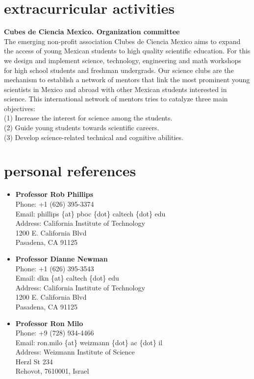 \documentclass[]{friggeri-cv}
\begin{document}
\section{extracurricular activities}
\textbf{Cubes de Ciencia Mexico. Organization committee}\\
The emerging non-profit association Clubes de Ciencia Mexico aims to expand the access of young Mexican students to high quality scientific education. For this we design and implement science, technology, engineering and math workshops for high school students and freshman undergrads. Our science clubs are the mechanism to establish a network of mentors that link the most prominent young scientists in Mexico and abroad with other Mexican students interested in science. This international network of mentors tries to catalyze three main objectives:\\
(1) Increase the interest for science among the students.\\
(2) Guide young students towards scientific careers.\\
(3) Develop science-related technical and cognitive abilities.

\newpage 
\section{personal references}
\begin{itemize}
	\item \textbf{Professor Rob Phillips}\\
	Phone:  +1 (626) 395-3374\\
	Email:  phillips \{at\} pboc \{dot\} caltech \{dot\} edu\\
	Address:  California Institute of Technology\\
	1200 E. California Blvd\\
	Pasadena, CA 91125
	
	\item \textbf{Professor Dianne Newman}\\
	Phone:  +1 (626)  395-3543\\
	Email:  dkn \{at\} caltech \{dot\} edu\\
	Address:  California Institute of Technology\\
	1200 E. California Blvd\\
	Pasadena, CA 91125
	
	\item \textbf{Professor Ron Milo}\\
	Phone: +9 (728) 934-4466\\
	Email:  ron.milo \{at\} weizmann \{dot\} ac \{dot\} il\\
	Address:  Weizmann Institute of Science\\
	Herzl St 234\\
	Rehovot, 7610001, Israel
\end{itemize}
\end{document}
